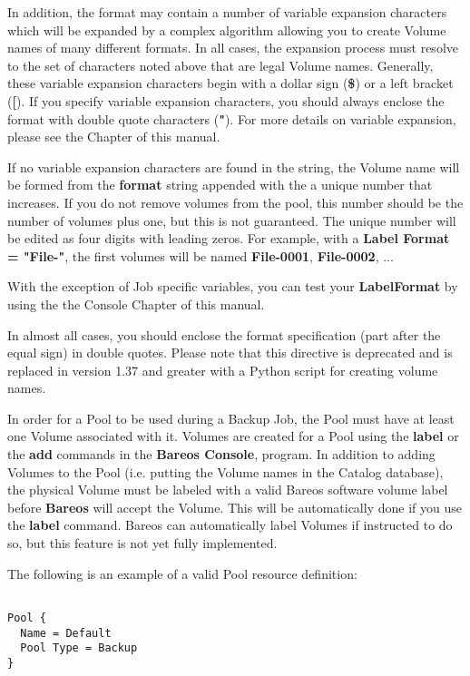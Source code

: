 \begin{description}
In addition, the format may contain a number of variable expansion
characters which will be expanded by a complex algorithm allowing you to
create Volume names of many different formats.  In all cases, the
expansion process must resolve to the set of characters noted above that
are legal Volume names.  Generally, these variable expansion characters
begin with a dollar sign ({\bf \$}) or a left bracket ({\bf [}).  If you
specify variable expansion characters, you should always enclose the
format with double quote characters ({\bf "}).  For more details on
variable expansion, please see the  Chapter of this manual.

If no variable expansion characters are found in the string, the Volume
name will be formed from the {\bf format} string appended with the
a unique number that increases.  If you do not remove volumes from the
pool, this number should be the number of volumes plus one, but this
is not guaranteed. The unique number will be edited as four
digits with leading zeros.  For example, with a {\bf Label Format =
"File-"}, the first volumes will be named {\bf File-0001}, {\bf
File-0002}, ...

With the exception of Job specific variables, you can test your {\bf
LabelFormat} by using the  the Console Chapter
of this manual.

In almost all cases, you should enclose the format specification (part
after the equal sign) in double quotes.  Please note that this directive
is deprecated and is replaced in version 1.37 and greater with a Python
script for creating volume names.
\end{description}

In order for a Pool to be used during a Backup Job, the Pool must have at
least one Volume associated with it.  Volumes are created for a Pool using
the {\bf label} or the {\bf add} commands in the {\bf Bareos Console},
program.  In addition to adding Volumes to the Pool (i.e.  putting the
Volume names in the Catalog database), the physical Volume must be labeled
with a valid Bareos software volume label before {\bf Bareos} will accept
the Volume.  This will be automatically done if you use the {\bf label}
command.  Bareos can automatically label Volumes if instructed to do so,
but this feature is not yet fully implemented.

The following is an example of a valid Pool resource definition:

\footnotesize
\begin{verbatim}

Pool {
  Name = Default
  Pool Type = Backup
}
\end{verbatim}
\normalsize

